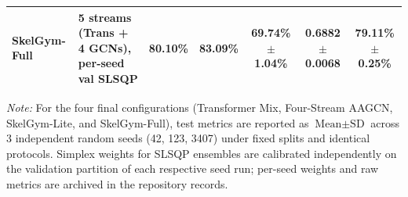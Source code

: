 \documentclass[preprint,12pt]{elsarticle}
\begin{document}
\begin{table}[!t]
{\begin{tabular}{l l c c | c c c}
\textbf{SkelGym-Full}       & 5 streams (Trans + 4 GCNs), per-seed val SLSQP & \textbf{80.10\%} & \textbf{83.09\%} & \textbf{69.74\% $\pm$ 1.04\%} & \textbf{0.6882 $\pm$ 0.0068} & \textbf{79.11\% $\pm$ 0.25\%} \\
\bottomrule
\end{tabular}
}
\vspace{1mm}
\footnotesize{\textit{Note:} For the four final configurations (Transformer Mix, Four-Stream AAGCN, SkelGym-Lite, and SkelGym-Full), test metrics are reported as $\text{Mean} \pm \text{SD}$ across 3 independent random seeds (42, 123, 3407) under fixed splits and identical protocols. Simplex weights for SLSQP ensembles are calibrated independently on the validation partition of each respective seed run; per-seed weights and raw metrics are archived in the repository records.}
\end{table}
\end{document}
